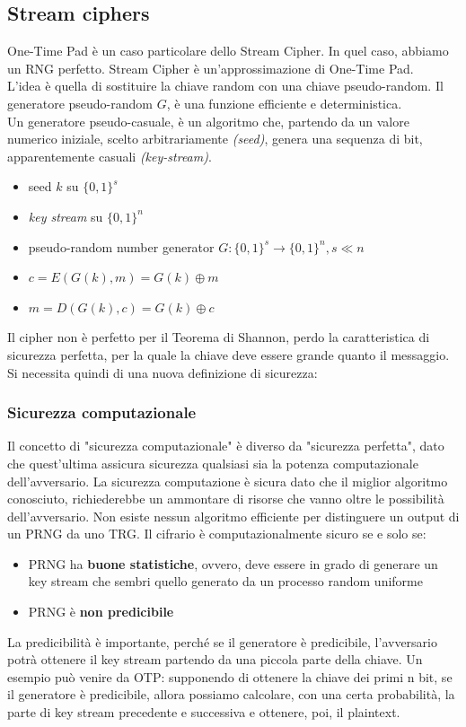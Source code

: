 \documentclass[a4paper,12pt]{article}
\begin{document}
\subsection{Stream ciphers}
One-Time Pad è un caso particolare dello Stream Cipher. In quel caso, abbiamo un RNG perfetto. 
Stream Cipher è un'approssimazione di One-Time Pad. \\
L'idea è quella di sostituire la chiave random con una chiave pseudo-random. Il generatore pseudo-random $G$, è una funzione efficiente e deterministica. \\
Un generatore pseudo-casuale, è un algoritmo che, partendo da un valore numerico iniziale, scelto arbitrariamente \textit{(seed)}, genera una sequenza di bit, apparentemente casuali \textit{(key-stream)}.
\begin{itemize}
	\item seed $k$ su $\{0,1\}^s$
	\item \textit{key stream} su $\{0,1\}^n$
	\item pseudo-random number generator $G : \{0,1\}^s \rightarrow \{0,1\}^n, s \ll n$
	\item $c = E(G(k), m) = G(k) \oplus m$
	\item $m = D(G(k), c) = G(k) \oplus c$
\end{itemize}
Il cipher non è perfetto per il Teorema di Shannon, perdo la caratteristica di sicurezza perfetta, per la quale la chiave deve essere grande quanto il messaggio. \\
Si necessita quindi di una nuova definizione di sicurezza:

\subsubsection{Sicurezza computazionale}
Il concetto di "sicurezza computazionale" è diverso da "sicurezza perfetta", dato che quest'ultima assicura sicurezza qualsiasi sia la potenza computazionale dell'avversario.
La sicurezza computazione è sicura dato che il miglior algoritmo conosciuto, richiederebbe un ammontare di risorse che vanno oltre le possibilità dell'avversario.
Non esiste nessun algoritmo efficiente per distinguere un output di un PRNG da uno TRG.
Il cifrario è computazionalmente sicuro se e solo se:
\begin{itemize}
	\item PRNG ha \textbf{buone statistiche}, ovvero, deve essere in grado di generare un key stream che sembri quello generato da un processo random uniforme
	\item PRNG è \textbf{non predicibile}
\end{itemize}
La predicibilità è importante, perché se il generatore è predicibile, l'avversario potrà ottenere il key stream partendo da una piccola parte della chiave.
Un esempio può venire da OTP: supponendo di ottenere la chiave dei primi n bit, se il generatore è predicibile, allora possiamo calcolare,
con una certa probabilità, la parte di key stream precedente e successiva e ottenere, poi, il plaintext.
\end{document}
